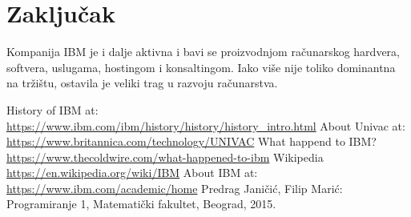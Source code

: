 \documentclass[a4paper]{article}
\begin{document}
\section{Zaključak}
Kompanija IBM je i dalje aktivna i bavi se proizvodnjom računarskog hardvera, softvera, uslugama, hostingom i konsaltingom. Iako više nije toliko dominantna na tržištu, ostavila je veliki trag u razvoju računarstva. 
\pagebreak
{}
\renewcommand{\refname}{Literatura}
\begin{thebibliography}{10}

 History of IBM at:\\ \url{https://www.ibm.com/ibm/history/history/history_intro.html}
 About Univac at: \url{https://www.britannica.com/technology/UNIVAC}
 What happend to IBM?\\ \url{https://www.thecoldwire.com/what-happened-to-ibm}
 Wikipedia \url{https://en.wikipedia.org/wiki/IBM} %
 About IBM at: \url{https://www.ibm.com/academic/home}
 Predrag Janičić, Filip Marić: Programiranje 1, Matematički fakultet, Beograd, 2015.
\end{thebibliography}
\end{document}
